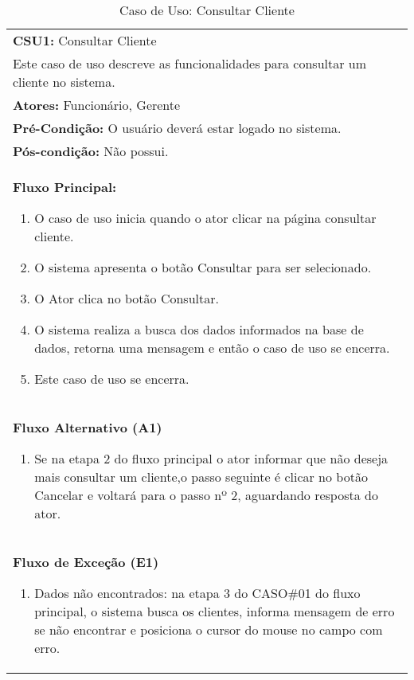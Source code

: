 \begin{table}[htpb!]
 \caption{Caso de Uso: Consultar Cliente}
  \begin{center}
    \begin{tabularx}{1.0\textwidth}{|X|}
    \hline
      \textbf{CSU1:} Consultar Cliente\\
      Este caso de uso descreve as funcionalidades para consultar um cliente no sistema.\\
      \hline
      \textbf{Atores:} Funcionário, Gerente\\
      \hline
      \textbf{Pré-Condição:} O usuário deverá estar logado no sistema.\\
      \hline
      \textbf{Pós-condição:} Não possui.\\
      \hline
      \textbf{Fluxo Principal:}
      \begin{enumerate}
        \item O caso de uso inicia quando o ator clicar na página consultar cliente.
        \item O sistema apresenta o botão Consultar para ser selecionado.
        \item O Ator clica no botão Consultar.
        \item O sistema realiza a busca dos dados informados na base de dados, retorna uma mensagem e então o caso de uso se encerra.
        \item Este caso de uso se encerra.
      \end{enumerate}\\
    \hline
      \textbf{Fluxo Alternativo (A1)}
      \begin{enumerate}
      \renewcommand{\labelenumi}{\alph{enumi}.}
        \item Se na etapa 2 do fluxo principal o ator informar que não deseja mais consultar um cliente,o passo seguinte é clicar no botão Cancelar e voltará para o passo nº 2, aguardando resposta do ator.
      \end{enumerate}\\
      \hline
      \textbf{Fluxo de Exceção (E1)}
      \begin{enumerate}
      \renewcommand{\labelenumi}{\alph{enumi}.}
        \item Dados não encontrados: na etapa 3 do CASO\#01 do fluxo principal, o sistema busca os clientes, informa mensagem de erro se não encontrar e posiciona o cursor do mouse no campo com erro.
      \end{enumerate}\\
    \hline
    \end{tabularx}
  \end{center}
  \label{dcu1}
\end{table}
\pagebreak


